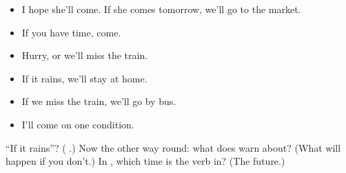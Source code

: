 \begin{itemize}
\raggedright
  \item I hope she'll come. If she comes tomorrow, we'll go to the market.
  \item If you have time, come.
  \item Hurry, or we'll miss the train.
  \item If it rains, we'll stay at home.
  \item If we miss the train, we'll go by bus.
  \item I'll come on one condition.
\end{itemize}

\begin{tcolorbox}[breakable,colback=teal!4,colframe=teal!35!black,title={Before you move on}]
\textquotedblleft{}If it rains\textquotedblright{}? (\textbf{  }.) Now the other way round: what does \textbf{} warn about? (What will happen if you don't.) In \textbf{    }, which time is the verb in? (The future.)
\end{tcolorbox}
